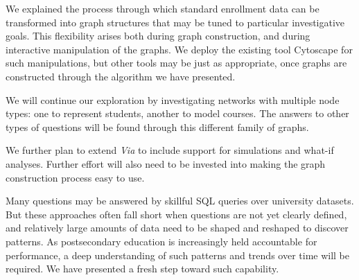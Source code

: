 \documentclass{sigchi}
\begin{document}
We explained the process through which standard enrollment data can be
transformed into graph structures that may be tuned to particular
investigative goals. This flexibility arises both during graph
construction, and during interactive manipulation of the
graphs. We deploy the existing tool Cytoscape for such
manipulations, but other tools may be just as appropriate, once graphs
are constructed through the algorithm we have presented.

We will continue our exploration by investigating networks with
multiple node types: one to represent students, another to model
courses. The answers to other types of questions will be found through
this different family of graphs. 

We further plan to extend {\em Via} to include support for simulations
and what-if analyses. Further effort will also need to be invested
into making the graph construction process easy to use. 

Many questions may be answered by skillful SQL queries over university
datasets. But these approaches often fall short when questions are
not yet clearly defined, and relatively large amounts of data need to
be shaped and reshaped to discover patterns. As postsecondary
education is increasingly held accountable for performance, a deep
understanding of such patterns and trends over time will be
required. We have presented a fresh step toward such capability.

\balance{}

{\small}
\end{document}
